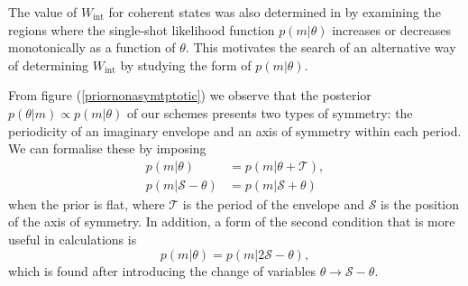 The value of $W_{\mathrm{int}}$ for coherent states was also determined in \cite{kolodynski2014} by examining the regions where the single-shot likelihood function $p(m|\theta)$ increases or decreases monotonically as a function of $\theta$. This motivates the search of an alternative way of determining $W_{\mathrm{int}}$ by studying the form of $p(m|\theta)$.

From figure (\ref{priornonasymtptotic}) we observe that the posterior $p(\theta|m) \propto p(m|\theta)$ of our schemes presents two types of symmetry: the periodicity of an imaginary envelope and an axis of symmetry within each period. We can formalise these by imposing
\begin{align}
p(m|\theta) &= p(m|\theta + \mathcal{T}),
\nonumber \\
p(m|\mathcal{S} - \theta) &= p(m|\mathcal{S} + \theta)
\label{symconstr}
\end{align}
when the prior is flat, where $\mathcal{T}$ is the period of the envelope and $\mathcal{S}$ is the position of the axis of symmetry. In addition, a form of the second condition that is more useful in calculations is
\begin{equation}
p(m|\theta) = p(m|2\mathcal{S}-\theta),
\label{easiersym}
\end{equation}
which is found after introducing the change of variables $\theta \rightarrow \mathcal{S} - \theta$.

